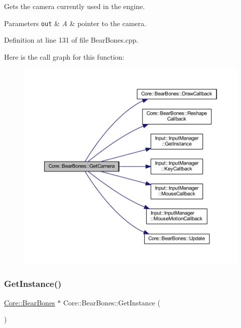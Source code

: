 Gets the camera currently used in the engine. 
\begin{DoxyParams}[1]{Parameters}
\mbox{\tt out}  & {\em A} & pointer to the camera. \\
\hline
\end{DoxyParams}


Definition at line 131 of file Bear\+Bones.\+cpp.

Here is the call graph for this function\+:
\nopagebreak
\begin{figure}[H]
\begin{center}
\leavevmode
\includegraphics[width=350pt]{class_core_1_1_bear_bones_a4566808b082431ab19831dee7afd700b_cgraph}
\end{center}
\end{figure}
\mbox{\label{class_core_1_1_bear_bones_acd30744bc23c254b1c211b3370c5285b}} 
\subsubsection{\texorpdfstring{Get\+Instance()}{GetInstance()}}
{\footnotesize\ttfamily \hyperlink{class_core_1_1_bear_bones}{Core\+::\+Bear\+Bones} $\ast$ Core\+::\+Bear\+Bones\+::\+Get\+Instance (\begin{DoxyParamCaption}{ }\end{DoxyParamCaption})\hspace{0.3cm}{\ttfamily [static]}}

